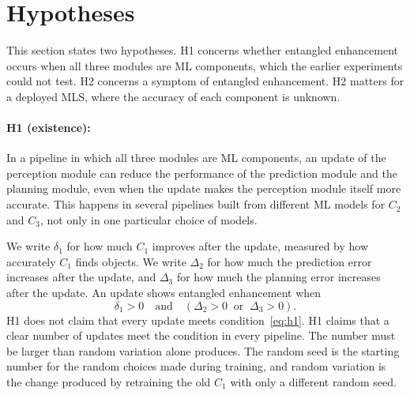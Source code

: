 \documentclass[11pt,a4paper]{article}
\begin{document}
\section{Hypotheses}
\label{sec:hyp}

This section states two hypotheses. H1 concerns whether entangled
enhancement occurs when all three modules are ML components, which the
earlier experiments could not test. H2 concerns a symptom of entangled
enhancement. H2 matters for a
deployed MLS, where the accuracy of each component is unknown.

\paragraph{H1 (existence):} In a pipeline in which all three modules are ML
components, an update of the perception module can reduce the performance
of the prediction module and the planning module, even when the update
makes the perception module itself more accurate. This happens in several
pipelines built from different ML models for $C_2$ and $C_3$, not only in
one particular choice of models.

We write $\delta_1$ for how much $C_1$ improves after the update, measured
by how accurately $C_1$ finds objects. We write $\Delta_2$ for how much the
prediction error increases after the update, and $\Delta_3$ for how much
the planning error increases after the update. An update shows entangled
enhancement when
\begin{equation}
\delta_1 > 0 \quad \text{and} \quad (\Delta_2 > 0 \ \text{ or } \ \Delta_3 > 0) .
\label{eq:h1}
\end{equation}
H1 does not claim that every update meets condition~\eqref{eq:h1}. H1
claims that a clear number of updates meet the condition in every
pipeline. The number must be larger than random variation alone produces.
The random seed is the starting number for the random choices made during
training, and random variation is the change produced by retraining the
old $C_1$ with only a different random seed.
\end{document}
